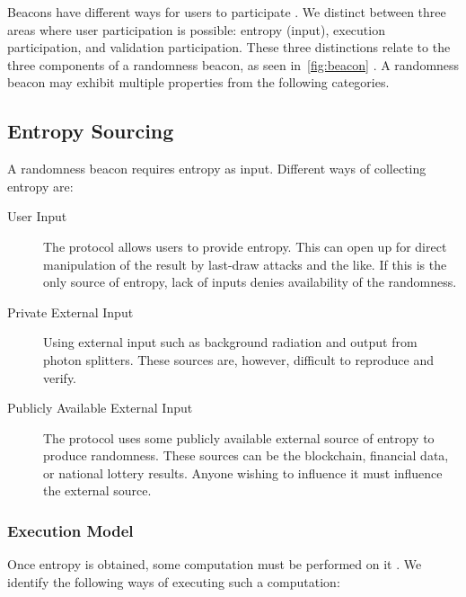 Beacons have different ways for users to participate . We distinct between three areas where user participation is possible: entropy (input), execution participation, and validation participation. These three distinctions relate to the three components of a randomness beacon, as seen in~\vref{fig:beacon} . A randomness beacon may exhibit multiple properties from the following categories.

\subsection{Entropy Sourcing}
A randomness beacon requires entropy as input. Different ways of collecting entropy are:

\begin{description}
    \item [User Input] The protocol allows users to provide entropy. This can open up for direct manipulation of the result by last-draw attacks and the like. If this is the only source of entropy, lack of inputs denies availability of the randomness.
    \item [Private External Input] Using external input such as background radiation and output from photon splitters. These sources are, however, difficult to reproduce and verify.
    \item [Publicly Available External Input] The protocol uses some publicly available external source of entropy to produce randomness. These sources can be the blockchain, financial data, or national lottery results. Anyone wishing to influence it must influence the external source. 
\end{description}

\subsubsection{Execution Model}
Once entropy is obtained, some computation must be performed on it . We identify the following ways of executing such a computation:

